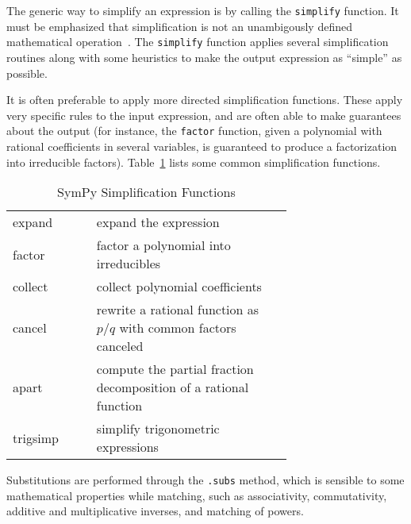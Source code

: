 




The generic way to simplify an expression is by calling the \texttt{simplify}
function.
It must be emphasized that simplification is not an unambigously defined
mathematical operation~\cite{Carette2004understanding}.
The \texttt{simplify} function applies several simplification routines along
with some heuristics to make the output expression as ``simple'' as possible.

It is often preferable to apply more directed simplification functions. These
apply very specific rules to the input expression, and are often able to make
guarantees about the output (for instance, the \texttt{factor} function, given
a polynomial with rational coefficients in several variables, is guaranteed to
produce a factorization into irreducible factors).
Table~\ref{simplify-table} lists some common simplification functions.

\begin{longtable}[htbc]{lp{0.7\linewidth}}
\caption{SymPy Simplification Functions\label{simplify-table}}\\
\toprule
expand & expand the expression \\
factor & factor a polynomial into irreducibles \\
collect & collect polynomial coefficients \\
cancel & rewrite a rational function as $p/q$ with common factors canceled \\
apart & compute the partial fraction decomposition of a rational function \\
trigsimp & simplify trigonometric expressions~\cite{fu2006automated} \\
\bottomrule
\end{longtable}

Substitutions are performed through the \texttt{.subs} method, which is
sensible to some mathematical properties while matching, such as
associativity, commutativity, additive and multiplicative inverses, and
matching of powers.

